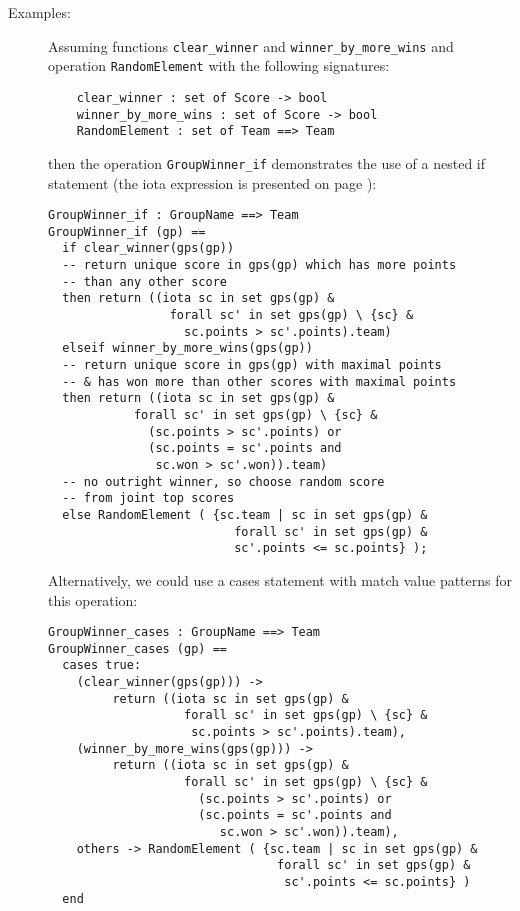 \documentclass{overturerepchap}
\begin{document}
{\begin{description}
\item[Examples:] Assuming functions \texttt{clear\_winner} and
  \texttt{winner\_by\_more\_wins} and operation \texttt{RandomElement}
  with the following signatures:
  \begin{lstlisting}
    clear_winner : set of Score -> bool
    winner_by_more_wins : set of Score -> bool
    RandomElement : set of Team ==> Team
  \end{lstlisting}
  then the operation \texttt{GroupWinner\_if} demonstrates the use of a
  nested if statement (the iota expression is presented on page
  \pageref{iotaexpr}):
  \begin{lstlisting}
GroupWinner_if : GroupName ==> Team
GroupWinner_if (gp) ==
  if clear_winner(gps(gp))
  -- return unique score in gps(gp) which has more points
  -- than any other score
  then return ((iota sc in set gps(gp) &
                 forall sc' in set gps(gp) \ {sc} &
                   sc.points > sc'.points).team)
  elseif winner_by_more_wins(gps(gp))
  -- return unique score in gps(gp) with maximal points
  -- & has won more than other scores with maximal points
  then return ((iota sc in set gps(gp) &
            forall sc' in set gps(gp) \ {sc} &
              (sc.points > sc'.points) or
              (sc.points = sc'.points and
               sc.won > sc'.won)).team)
  -- no outright winner, so choose random score
  -- from joint top scores
  else RandomElement ( {sc.team | sc in set gps(gp) &
                          forall sc' in set gps(gp) &
                          sc'.points <= sc.points} );
  \end{lstlisting}
  Alternatively, we could use a cases statement with match value patterns for
  this operation:
  \begin{lstlisting}
GroupWinner_cases : GroupName ==> Team
GroupWinner_cases (gp) ==
  cases true:
    (clear_winner(gps(gp))) ->
         return ((iota sc in set gps(gp) &
                   forall sc' in set gps(gp) \ {sc} &
                    sc.points > sc'.points).team),
    (winner_by_more_wins(gps(gp))) ->
         return ((iota sc in set gps(gp) &
                   forall sc' in set gps(gp) \ {sc} &
                     (sc.points > sc'.points) or
                     (sc.points = sc'.points and
                        sc.won > sc'.won)).team),
    others -> RandomElement ( {sc.team | sc in set gps(gp) &
                                forall sc' in set gps(gp) &
                                 sc'.points <= sc.points} )
  end
  \end{lstlisting}


\end{description}}
\end{document}
